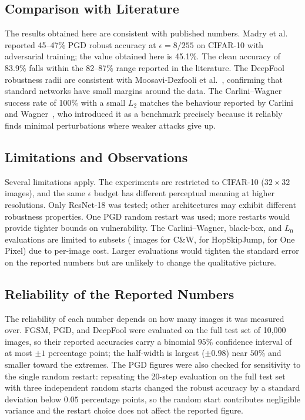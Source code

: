 \subsection{Comparison with Literature}

The results obtained here are consistent with published numbers. Madry et al.~\cite{madry2018towards} reported 45--47\% PGD robust accuracy at $\epsilon = 8/255$ on CIFAR-10 with adversarial training; the value obtained here is 45.1\%. The clean accuracy of 83.9\% falls within the 82--87\% range reported in the literature. The DeepFool robustness radii are consistent with Moosavi-Dezfooli et al.~\cite{moosavidezfooli2016deepfool}, confirming that standard networks have small margins around the data. The Carlini--Wagner success rate of 100\% with a small $L_2$ matches the behaviour reported by Carlini and Wagner~\cite{carlini2017towards}, who introduced it as a benchmark precisely because it reliably finds minimal perturbations where weaker attacks give up.

\subsection{Limitations and Observations}

Several limitations apply. The experiments are restricted to CIFAR-10 ($32 \times 32$ images), and the same $\epsilon$ budget has different perceptual meaning at higher resolutions. Only ResNet-18 was tested; other architectures may exhibit different robustness properties. One PGD random restart was used; more restarts would provide tighter bounds on vulnerability. The Carlini--Wagner, black-box, and $L_0$ evaluations are limited to subsets (\CWN{} images for C\&W, \HSJN{} for HopSkipJump, \OPN{} for One Pixel) due to per-image cost. Larger evaluations would tighten the standard error on the reported numbers but are unlikely to change the qualitative picture.

\subsection{Reliability of the Reported Numbers}
\label{sec:reliability}

The reliability of each number depends on how many images it was measured over. FGSM, PGD, and DeepFool were evaluated on the full test set of 10{,}000 images, so their reported accuracies carry a binomial $95\%$ confidence interval of at most $\pm 1$ percentage point; the half-width is largest ($\pm 0.98$) near $50\%$ and smaller toward the extremes. The PGD figures were also checked for sensitivity to the single random restart: repeating the 20-step evaluation on the full test set with three independent random starts changed the robust accuracy by a standard deviation below $0.05$ percentage points, so the random start contributes negligible variance and the restart choice does not affect the reported figure.

